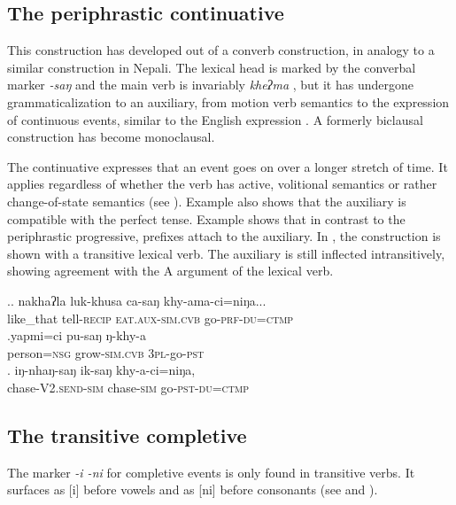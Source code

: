 \subsection{The periphrastic continuative}

This construction has developed out of a converb construction, in analogy to a similar construction in Nepali. The lexical head is marked by the converbal marker \emph{-saŋ} and the  main verb is invariably \emph{kheʔma} , but it has undergone grammaticalization to an auxiliary, from motion verb semantics to the expression of continuous events, similar to the English expression . A formerly biclausal construction has become monoclausal.

The continuative expresses that an event goes on over a longer stretch of time. It applies regardless of whether the verb has active, volitional semantics \Next[a] or rather change-of-state semantics (see \Next[b]). Example \Next[a] also shows that the auxiliary is compatible  with the perfect tense. Example \Next[b] shows that in contrast to the periphrastic progressive, prefixes attach to the auxiliary. In \Next[c], the construction is shown with a transitive lexical verb. The auxiliary is still inflected intransitively, showing agreement with the A argument of the lexical verb.  
 	
\ex.\ag. nakhaʔla   luk-khusa    ca-saŋ           khy-ama-ci=niŋa...\\
like\_that tell{\scshape -recip} {\scshape eat.aux-sim.cvb} go{\scshape -prf-du=ctmp}\\
 
\bg.yapmi=ci pu-saŋ ŋ-khy-a\\
person{\scshape =nsg} grow{\scshape -sim.cvb}  {\scshape 3pl-}go{\scshape -pst}\\
 
 \bg.      iŋ-nhaŋ-saŋ            ik-saŋ         khy-a-ci=niŋa,\\
 chase{\scshape -V2.send-sim} chase{\scshape -sim} go{\scshape -pst-du=ctmp}\\
  
 
\subsection{The transitive completive}\label{completive}
 
 The marker  \emph{-i \ti -ni} for completive events is only found in transitive verbs. It surfaces as [i] before vowels and as [ni] before consonants (see \Next and \NNext). 
 
